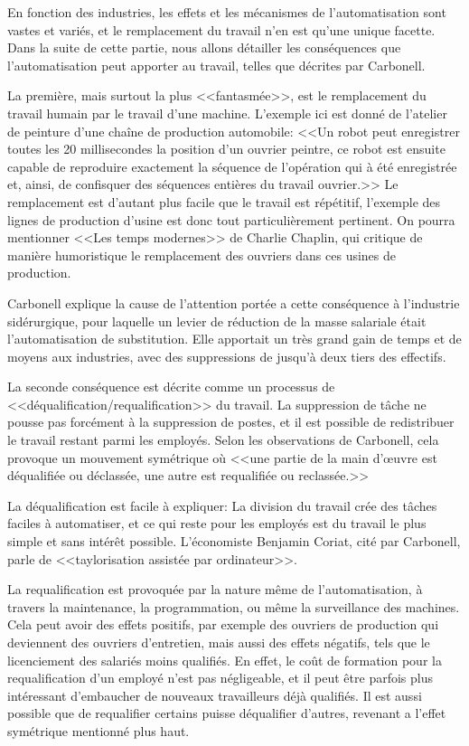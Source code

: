 \documentclass[openany, 11pt]{memoir}
\begin{document}
En fonction des industries, les effets et les mécanismes de l'automatisation sont vastes et variés, et le remplacement du travail n'en est qu'une unique facette. Dans la suite de cette partie, nous allons détailler les conséquences que l'automatisation peut apporter au travail, telles que décrites par Carbonell.

\bigskip
La première, mais surtout la plus <<fantasmée>>, est le remplacement du travail humain par le travail d'une machine. L'exemple ici est donné de l'atelier de peinture d'une chaîne de production automobile: <<Un robot peut enregistrer toutes les 20 millisecondes la position d'un ouvrier peintre, ce robot est ensuite capable de reproduire exactement la séquence de l'opération qui à été enregistrée et, ainsi, de confisquer des séquences entières du travail ouvrier.>> Le remplacement est d'autant plus facile que le travail est répétitif, l'exemple des lignes de production d'usine est donc tout particulièrement pertinent. On pourra mentionner <<Les temps modernes>> de Charlie Chaplin, qui critique de manière humoristique le remplacement des ouvriers dans ces usines de production.

Carbonell explique la cause de l'attention portée a cette conséquence à l'industrie sidérurgique, pour laquelle un levier de réduction de la masse salariale était l'automatisation de substitution. Elle apportait un très grand gain de temps et de moyens aux industries, avec des suppressions de jusqu'à deux tiers des effectifs.

\bigskip
La seconde conséquence est décrite comme un processus de <<déqualification/requalification>> du travail. La suppression de tâche ne pousse pas forcément à la suppression de postes, et il est possible de redistribuer le travail restant parmi les employés. Selon les observations de Carbonell, cela provoque un mouvement symétrique où <<une partie de la main d'œuvre est déqualifiée ou déclassée, une autre est requalifiée ou reclassée.>>

La déqualification est facile à expliquer: La division du travail crée des tâches faciles à automatiser, et ce qui reste pour les employés est du travail le plus simple et sans intérêt possible. L'économiste Benjamin Coriat, cité par Carbonell, parle de <<taylorisation assistée par ordinateur>>.

La requalification est provoquée par la nature même de l'automatisation, à travers la maintenance, la programmation, ou même la surveillance des machines. Cela peut avoir des effets positifs, par exemple des ouvriers de production qui deviennent des ouvriers d'entretien, mais aussi des effets négatifs, tels que le licenciement des salariés moins qualifiés. En effet, le coût de formation pour la requalification d'un employé n'est pas négligeable, et il peut être parfois plus intéressant d'embaucher de nouveaux travailleurs déjà qualifiés. Il est aussi possible que de requalifier certains puisse déqualifier d'autres, revenant a l'effet symétrique mentionné plus haut.
\end{document}
